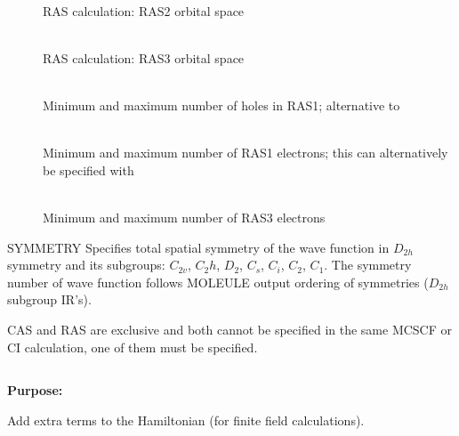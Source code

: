 \begin{description}
\item[]
    \\
   RAS calculation: RAS2 orbital space
 
\item[]
    \\
   RAS calculation: RAS3 orbital space
 
\item[]
   \\
  Minimum and maximum number of holes in RAS1; alternative
  to 
 
\item[]
    \\
   Minimum and maximum number of RAS1 electrons; this can alternatively
   be specified with 
 
\item[]
    \\
   Minimum and maximum number of RAS3 electrons
\end{description}
 
 
\noindent
SYMMETRY   Specifies total spatial symmetry of the wave function in
$D_{2h}$ symmetry and its subgroups: $C_{2v}$, $C_2h$, $D_2$, $C_s$, $C_i$,
$C_2$, $C_1$. The  symmetry number of wave function follows MOLEULE
output ordering of symmetries ($D_{2h}$ subgroup IR's).
  
\noindent
CAS and RAS are exclusive and
both cannot be specified in the same 
MCSCF or CI
calculation, one of them must be specified. 
 
 
\pagebreak[3]
\subsection{\label{ref-haminp}}
 
{\bf Purpose:}
 
Add extra terms to the Hamiltonian (for finite field calculations). 
 
